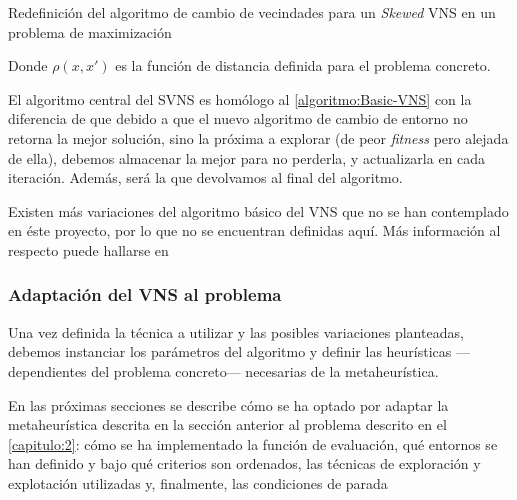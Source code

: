 \begin{algorithm}[h]
	\caption{Redefinición del algoritmo de cambio de vecindades para un \textit{Skewed} VNS en un problema de maximización}
	\label{algoritmo:SVNS-cambio-entornos}
	
	\DontPrintSemicolon
	\bigskip
	
	
\end{algorithm}

Donde $\rho(x,x')$ es la función de distancia definida para el problema concreto.

El algoritmo central del SVNS es homólogo al \autoref{algoritmo:Basic-VNS} con la diferencia de que debido a que el nuevo algoritmo de cambio de entorno no retorna la mejor solución, sino la próxima a explorar (de peor \textit{fitness} pero alejada de ella), debemos almacenar la mejor para no perderla, y actualizarla en cada iteración. Además, será la que devolvamos al final del algoritmo.

Existen más variaciones del algoritmo básico del VNS que no se han contemplado en éste proyecto, por lo que no se encuentran definidas aquí. Más información al respecto puede hallarse en~\cite{vns,info-adicional-vns}

\subsubsection{Adaptación del VNS al problema}
\label{apartado:adaptacion-VNS}

Una vez definida la técnica a utilizar y las posibles variaciones planteadas, debemos instanciar los parámetros del algoritmo y definir las heurísticas ---dependientes del problema concreto--- necesarias de la metaheurística.

En las próximas secciones se describe cómo se ha optado por adaptar la metaheurística descrita en la sección anterior al problema descrito en el \autoref{capitulo:2}: cómo se ha implementado la función de evaluación, qué entornos se han definido y bajo qué criterios son ordenados, las técnicas de exploración y explotación utilizadas y, finalmente, las condiciones de parada

